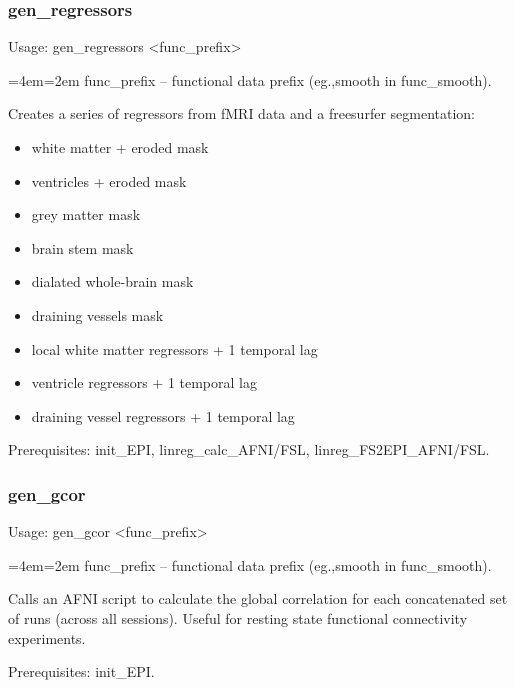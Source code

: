 \documentclass[final,titlepage,letterpaper,oneside,12pt]{article}
\renewcommand{\texttt}[2][BrickRed]{\textcolor{#1}{\ttfamily #2}}%
\newenvironment{blockquote}{%
  \par%
  \medskip
  \leftskip=4em\rightskip=2em%
  \noindent\ignorespaces}{%
  \par\medskip}
\begin{document}
\subsubsection{gen\_regressors}
Usage: \texttt{gen\_regressors <func\_prefix>}

\begin{blockquote}
func\_prefix -- functional data prefix (eg.,smooth in func\_smooth).
\end{blockquote}

\noindent Creates a series of regressors from fMRI data and a freesurfer segmentation: 

\begin{itemize} \itemsep-2pt
	\item{white matter + eroded mask}
	\item{ventricles + eroded mask}
	\item{grey matter mask}
	\item{brain stem mask}
	\item{dialated whole-brain mask}
	\item{draining vessels mask}
	\item{local white matter regressors + 1 temporal lag}
	\item{ventricle regressors + 1 temporal lag}
	\item{draining vessel regressors + 1 temporal lag}
\end{itemize}

Prerequisites: \texttt{init\_EPI}, \texttt{linreg\_calc\_AFNI/FSL}, \texttt{linreg\_FS2EPI\_AFNI/FSL}.

\subsubsection{gen\_gcor}
Usage: \texttt{gen\_gcor <func\_prefix>}

\begin{blockquote}
func\_prefix -- functional data prefix (eg.,smooth in func\_smooth).
\end{blockquote}

\noindent Calls an AFNI script to calculate the global correlation for each concatenated set of runs (across all sessions). Useful for resting state functional connectivity experiments.

Prerequisites: \texttt{init\_EPI}.

\end{document}
